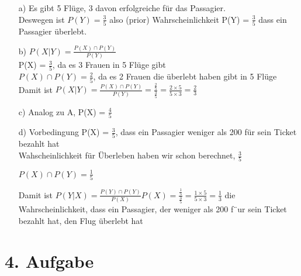 \begin{enumerate}

\item[a)]
Es gibt 5 Flüge, 3 davon erfolgreiche für das Passagier. \\
Deswegen ist $P(Y) = \frac{3}{5} $ also (prior) Wahrscheinlichkeit P(Y) = $\frac{3}{5}$ dass ein Passagier überlebt.

\item[b)]
$P(X|Y) = \frac{P(X) \cap P(Y)}{P(Y)}$ \\
P(X) = $\frac{3}{5}$, da es 3 Frauen in 5 Flüge gibt \\
$P(X) \cap P(Y) = \frac{2}{5}$, da es 2 Frauen die überlebt haben gibt in 5 Flüge \\
Damit ist $P(X|Y) = \frac{P(X) \cap P(Y)}{P(Y)} = \frac{\frac{2}{5}}{\frac{3}{5}} = \frac{2 \times 5}{5 \times 3} = \frac{2}{3}$

\item[c)]
Analog zu A, P(X) = $\frac{4}{5}$

\item[d)]
Vorbedingung P(X) = $\frac{3}{5}$, dass ein Passagier weniger als 200 für sein Ticket bezahlt hat \\
Wahscheinlichkeit für Überleben haben wir schon berechnet, $\frac{3}{5}$

$P(X) \cap P(Y) = \frac{1}{5}$

Damit ist $P(Y|X) = \frac{P(Y) \cap P(Y)}{P(X)}{P(X)} = \frac{\frac{1}{5}}{\frac{3}{5}} = \frac{1 \times 5}{5 \times 3} = \frac{1}{3}$ die Wahrscheinlichkeit, dass ein Passagier, der weniger als 200 f¨ur sein Ticket bezahlt hat, den Flug überlebt hat

\end{enumerate}

\section*{4. Aufgabe}

